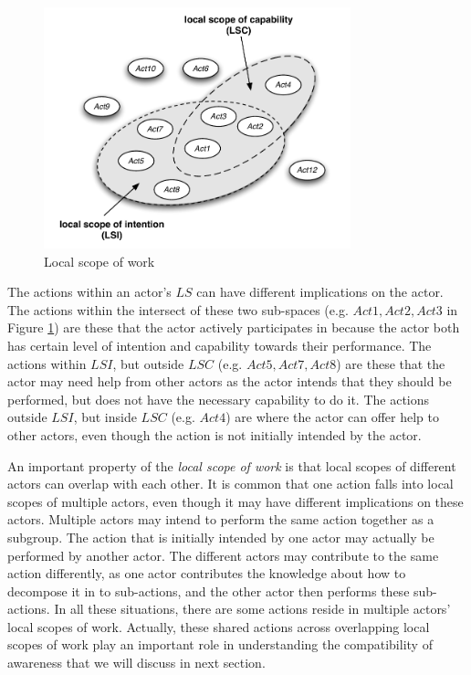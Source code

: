 \begin{figure}[htbp] %
   \centering
   \includegraphics[width=3.5in]{local_scope.pdf} 
   \caption{Local scope of work}
   \label{fig:local_scope}
\end{figure}

The actions within an actor's $LS$ can have different implications on the actor. The actions within the intersect of these two sub-spaces (e.g. $Act1,Act2,Act3$ in Figure \ref{fig:local_scope}) are these that the actor actively participates in because the actor both has certain level of intention and capability towards their performance. The actions within $LSI$, but outside $LSC$ (e.g. $Act5,Act7,Act8$) are these that the actor may need help from other actors as the actor intends that they should be performed, but does not have the necessary capability to do it. The actions outside $LSI$, but inside $LSC$ (e.g. $Act4$) are where the actor can offer help to other actors, even though the action is not initially intended by the actor.

An important property of the \emph{local scope of work} is that local scopes of different actors can overlap with each other. It is common that one action falls into local scopes of multiple actors, even though it may have different implications on these actors. Multiple actors may intend to perform the same action together as a subgroup. The action that is initially intended by one actor may actually be performed by another actor. The different actors may contribute to the same action differently, as one actor contributes the knowledge about how to decompose it in to sub-actions, and the other actor then performs these sub-actions. In all these situations, there are some actions reside in multiple actors' local scopes of work. Actually, these shared actions across overlapping local scopes of work play an important role in understanding the compatibility of awareness that we will discuss in next section.

